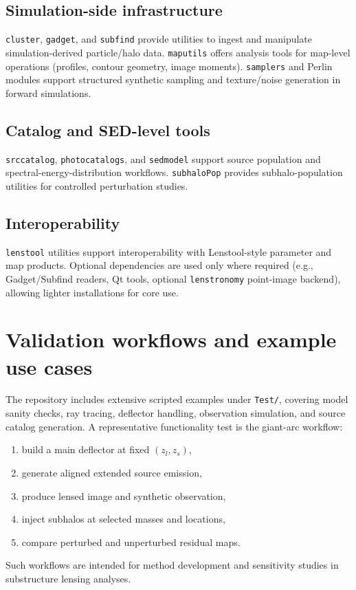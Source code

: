 \documentclass{aa}
\begin{document}
\subsection{Simulation-side infrastructure}
\texttt{cluster}, \texttt{gadget}, and \texttt{subfind} provide utilities to ingest and manipulate simulation-derived particle/halo data. \texttt{maputils} offers analysis tools for map-level operations (profiles, contour geometry, image moments). \texttt{samplers} and Perlin modules support structured synthetic sampling and texture/noise generation in forward simulations.

\subsection{Catalog and SED-level tools}
\texttt{srccatalog}, \texttt{photocatalogs}, and \texttt{sedmodel} support source population and spectral-energy-distribution workflows. \texttt{subhaloPop} provides subhalo-population utilities for controlled perturbation studies.

\subsection{Interoperability}
\texttt{lenstool} utilities support interoperability with Lenstool-style parameter and map products. Optional dependencies are used only where required (e.g., Gadget/Subfind readers, Qt tools, optional \texttt{lenstronomy} point-image backend), allowing lighter installations for core use.

\section{Validation workflows and example use cases}
The repository includes extensive scripted examples under \texttt{Test/}, covering model sanity checks, ray tracing, deflector handling, observation simulation, and source catalog generation. A representative functionality test is the giant-arc workflow:
\begin{enumerate}
\item build a main deflector at fixed $(z_l, z_s)$,
\item generate aligned extended source emission,
\item produce lensed image and synthetic observation,
\item inject subhalos at selected masses and locations,
\item compare perturbed and unperturbed residual maps.
\end{enumerate}
Such workflows are intended for method development and sensitivity studies in substructure lensing analyses.
\end{document}
